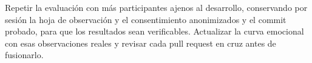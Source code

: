 Repetir la evaluación con más participantes ajenos al desarrollo, conservando por sesión la hoja de observación y el consentimiento anonimizados y el commit probado, para que los resultados sean verificables. Actualizar la curva emocional con esas observaciones reales y revisar cada pull request en cruz antes de fusionarlo.
